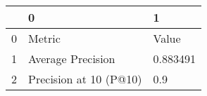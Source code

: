 \begin{tabular}{lll}
\toprule
{} &                       0 &         1 \\
\midrule
0 &                  Metric &     Value \\
1 &       Average Precision &  0.883491 \\
2 &  Precision at 10 (P@10) &       0.9 \\
\bottomrule
\end{tabular}
